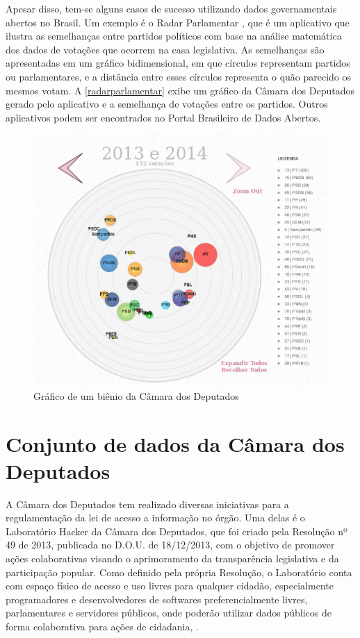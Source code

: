 \documentclass[
	12pt,				%
	openright,			%
	twoside,			%
	a4paper,			%
	english,			%
	french,				%
	spanish,			%
	brazil				%
	]{abntex2}
\begin{document}
Apesar disso, tem-se alguns casos de sucesso utilizando dados governamentais abertos no Brasil. Um exemplo é o Radar Parlamentar
, que é um aplicativo que ilustra as semelhanças entre partidos políticos com base na análise matemática dos 
dados de votações que ocorrem na casa legislativa. As semelhanças são apresentadas em um gráfico bidimensional, em que círculos 
representam partidos ou parlamentares, e a distância entre esses círculos representa o quão parecido os mesmos votam. A 
\autoref{radarparlamentar} exibe um gráfico da Câmara dos Deputados gerado pelo aplicativo e a semelhança de votações entre os
partidos. Outros aplicativos podem ser encontrados no Portal Brasileiro de Dados Abertos.

\begin{figure}[htb]
	\caption{\label{radarparlamentar}Gráfico de um biênio da Câmara dos Deputados}
	\begin{center}
	    \includegraphics[scale=0.5]{radarparlamentar.png}
	\end{center}
\end{figure}

\chapter{Conjunto de dados da Câmara dos Deputados} 
A Câmara dos Deputados tem realizado diversas iniciativas para a regulamentação da lei de acesso a informação no órgão. 
Uma delas é o Laboratório Hacker da Câmara dos Deputados, que foi criado pela Resolução nº 49 de 2013, publicada no D.O.U. 
de 18/12/2013, com o objetivo de promover ações colaborativas visando o aprimoramento da transparência legislativa e da 
participação popular. Como definido pela própria Resolução, o Laboratório conta com espaço físico de acesso e uso livres 
para qualquer cidadão, especialmente programadores e desenvolvedores de softwares preferencialmente livres, parlamentares e 
servidores públicos, onde poderão utilizar dados públicos de forma colaborativa para ações de cidadania, \cite{wsproposicoes}.
\end{document}
